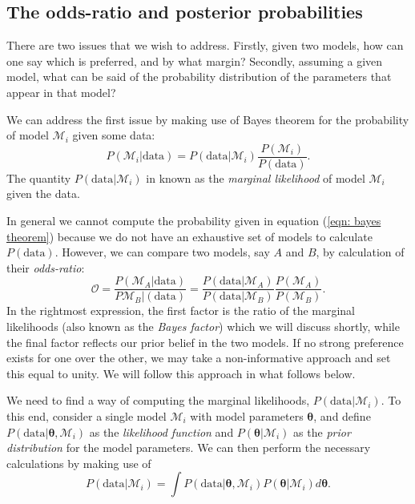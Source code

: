 \documentclass[../full_thesis/full_thesis.tex]{subfiles}
\newcommand{\M}{\mathcal{M}}
\newcommand{\data}{\textrm{data}}
\newcommand{\params}{\boldsymbol{\theta}}
\begin{document}
\subsection{The odds-ratio and posterior probabilities}

There are two issues that we wish to address.  Firstly, given two models, how
can one say which is preferred, and by what margin?  Secondly, assuming a given
model, what can be said of the probability distribution of the
parameters that appear in that model?

We can address the first issue by making use of Bayes theorem for the
probability of model $\M_{i}$ given some data:
\begin{equation}
    P(\M_{i} | \data) = P(\data | \M_{i}) \frac{P(\M_{i})}{P(\data)}.
\label{eqn: bayes theorem}
\end{equation}
The quantity $P(\data | \M_{i})$ in known as the \emph{marginal likelihood} of
model $\M_i$ given the data.

In general we cannot compute the probability given in equation (\ref{eqn: bayes
theorem})  because we do not have an exhaustive set of models to calculate
$P(\data)$.  However, we can compare two models, say $A$ and $B$, by
calculation of their \emph{odds-ratio}:
\begin{equation}
\mathcal{O} = \frac{P(\M_{A}|\data)}{P\M_{B}|(\data)}=
            \frac{P(\data|\M_{A})}{P(\data|\M_{B})}
            \frac{P(\M_{A})}{P(\M_{B})}.
\label{eqn: odds-ratio}
\end{equation}
In the rightmost expression, the first factor is the ratio of the marginal
likelihoods (also known as the \emph{Bayes factor}) which we will discuss
shortly, while the final factor reflects our prior belief in the two models. If
no strong preference exists for one over the other, we may take a
non-informative approach and set this equal to unity.  We will follow this
approach in what follows below.

We need to find a way of computing the marginal likelihoods, $P(\data |
\M_{i})$.  To this end, consider a single model  $\M_{i}$ with model parameters
$\params$, and define $P(\data| \params, \M_{i})$ as the \emph{likelihood
function} and $P(\params | \M_{i})$ as the \emph{prior distribution} for the
model parameters.   We can then perform the necessary calculations by making
use of
\begin{equation}
    P(\data|\M_{i}) = \int
                      P(\data| \params, \M_{i})P(\params | \M_{i})
                      d\params.
\label{eqn: marginal likelihood}
\end{equation}
\end{document}

